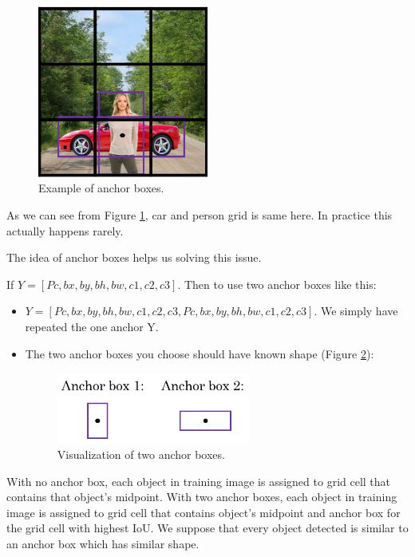\begin{figure}[!htbp]
    \centering
    \includegraphics[width=0.5\textwidth, trim={0 0 0 0}, clip]{img/c4/yolo3.png}
    \caption{Example of anchor boxes.}
    \label{anchor}
\end{figure}

As we can see from Figure \ref{anchor}, car and person grid is same here. In practice this actually happens rarely. 

The idea of anchor boxes helps us solving this issue.

If $Y = [Pc, bx, by, bh, bw, c1, c2, c3]$. Then to use two anchor boxes like this:

\begin{itemize}
    \item $Y = [Pc, bx, by, bh, bw, c1, c2, c3, Pc, bx, by, bh, bw, c1, c2, c3]$. We simply have repeated the one anchor Y.
    \item The two anchor boxes you choose should have known shape (Figure \ref{anchor2}):
    \begin{figure}
        \centering
        \includegraphics[width=0.6\textwidth]{img/c4/anchor2.png}
        \caption{Visualization of two anchor boxes.}
        \label{anchor2}
    \end{figure}
\end{itemize}

With no anchor box, each object in training image is assigned to grid cell that contains that object's midpoint. With two anchor boxes, each object in training image is assigned to grid cell that contains object's midpoint and anchor box for the grid cell with highest IoU. We suppose that every object detected is similar to an anchor box which has similar shape.

